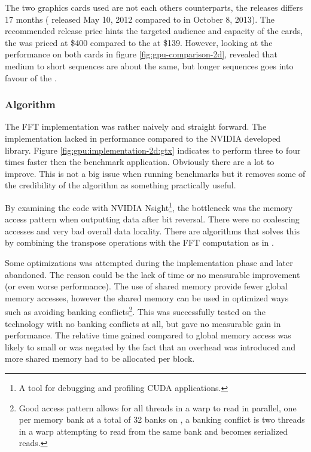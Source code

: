 The two graphics cards used are not each others counterparts, the releases differs 17 months ({\NVCARD} released May 10, 2012 compared to {\AMDCARD} in October 8, 2013). The recommended release price hints the targeted audience and capacity of the cards, the {\NVCARD} was priced at \$400 compared to the {\AMDCARD} at \$139. However, looking at the {\OCL} performance on both cards in figure \ref{fig:gpu-comparison-2d}, revealed that medium to short sequences are about the same, but longer sequences goes into favour of the {\NVCARD}.

\subsubsection{Algorithm}

The \gls{FFT} implementation was rather naively and straight forward. The implementation lacked in performance compared to the NVIDIA developed {\CUFFT} library. Figure \ref{fig:gpu:implementation-2d:gtx} indicates {\CUFFT} to perform three to four times faster then the benchmark application. Obviously there are a lot to improve. This is not a big issue when running benchmarks but it removes some of the credibility of the algorithm as something practically useful.

By examining the code with NVIDIA Nsight\footnote{A tool for debugging and profiling CUDA applications.}, the bottleneck was the memory access pattern when outputting data after bit reversal. There were no coalescing accesses and very bad overall data locality. There are algorithms that solves this by combining the transpose operations with the FFT computation as in \cite{govindaraju2008high}.

Some optimizations was attempted during the implementation phase and later abandoned. The reason could be the lack of time or no measurable improvement (or even worse performance). The use of shared memory provide fewer global memory accesses, however the shared memory can be used in optimized ways such as avoiding banking conflicts\footnote{Good access pattern allows for all threads in a warp to read in parallel, one per memory bank at a total of 32 banks on {\NVCARD}, a banking conflict is two threads in a warp attempting to read from the same bank and becomes serialized reads.}. This was successfully tested on the {\CU} technology with no banking conflicts at all, but gave no measurable gain in performance. The relative time gained compared to global memory access was likely to small or was negated by the fact that an overhead was introduced and more shared memory had to be allocated per block.

